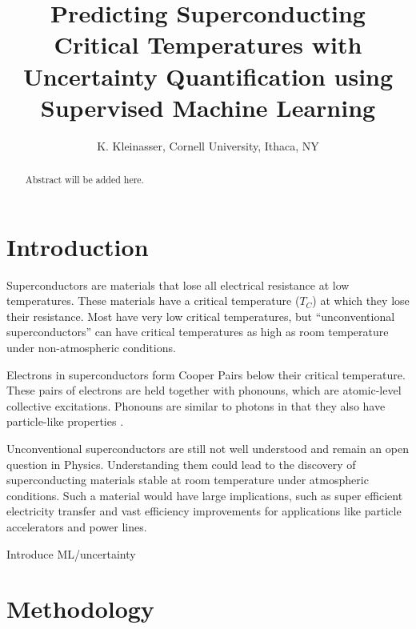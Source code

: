 \documentclass[twocolumn, nofootinbib, secnumarabic, amssymb, nobibnotes, aps, prd]{revtex4-2}
\begin{document}
%

\begin{abstract} %
Abstract will be added here.
\end{abstract}


\title{Predicting Superconducting Critical Temperatures with Uncertainty Quantification using Supervised Machine Learning}

\author{K. Kleinasser, Cornell University, Ithaca, NY}

\maketitle

\section{Introduction}
Superconductors are materials that lose all electrical resistance at low temperatures. These materials have a critical temperature ($T_C$) at which they lose their resistance. Most have very low critical temperatures, but “unconventional superconductors” can have critical temperatures as high as room temperature under non-atmospheric conditions. 

Electrons in superconductors form Cooper Pairs below their critical temperature. These pairs of electrons are held together with phonouns, which are atomic-level collective excitations. Phonouns are similar to photons in that they also have particle-like properties \cite{rohlf_1994}.

Unconventional superconductors are still not well understood and remain an open question in Physics. Understanding them could lead to the discovery of superconducting materials stable at room temperature under atmospheric conditions. Such a material would have large implications, such as super efficient electricity transfer and vast efficiency improvements for applications like particle accelerators and power lines.

Introduce ML/uncertainty

\section{Methodology}
\end{document}
